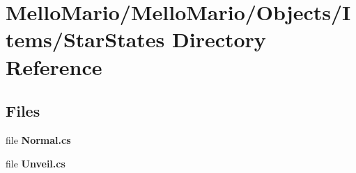 \section{Mello\+Mario/\+Mello\+Mario/\+Objects/\+Items/\+Star\+States Directory Reference}
\label{dir_e044142f9f833bd922b3564920eb935c}
\subsection*{Files}
\begin{DoxyCompactItemize}
\item 
file \textbf{ Normal.\+cs}
\item 
file \textbf{ Unveil.\+cs}
\end{DoxyCompactItemize}
